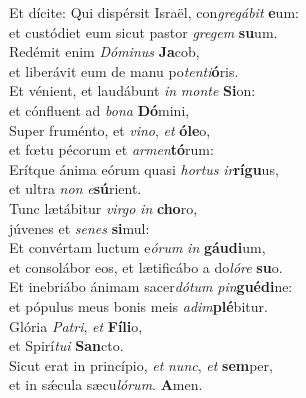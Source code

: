 \evenverse Et dícite: Qui dispérsit Israël, con\textit{gre}\textit{gá}\textit{bit} \textbf{e}um:~\*\\
\evenverse et custódiet eum sicut pastor \textit{gre}\textit{gem} \textbf{su}um.\\
\oddverse Redémit enim \textit{Dó}\textit{mi}\textit{nus} \textbf{Ja}cob,~\*\\
\oddverse et liberávit eum de manu po\textit{ten}\textit{ti}\textbf{ó}ris.\\
\evenverse Et vénient, et laudábunt \textit{in} \textit{mon}\textit{te} \textbf{Si}on:~\*\\
\evenverse et cónfluent ad \textit{bo}\textit{na} \textbf{Dó}mini,\\
\oddverse Super fruménto, et \textit{vi}\textit{no}, \textit{et} \textbf{ó}\textbf{le}o,~\*\\
\oddverse et fœtu pécorum et \textit{ar}\textit{men}\textbf{tó}rum:\\
\evenverse Erítque ánima eórum quasi \textit{hor}\textit{tus} \textit{ir}\textbf{rí}\textbf{gu}us,~\*\\
\evenverse et ultra \textit{non} \textit{e}\textbf{sú}rient.\\
\oddverse Tunc lætábitur \textit{vir}\textit{go} \textit{in} \textbf{cho}ro,~\*\\
\oddverse júvenes et \textit{se}\textit{nes} \textbf{si}mul:\\
\evenverse Et convértam luctum e\textit{ó}\textit{rum} \textit{in} \textbf{gáu}\textbf{di}um,~\*\\
\evenverse et consolábor eos, et lætificábo a do\textit{ló}\textit{re} \textbf{su}o.\\
\oddverse Et inebriábo ánimam sacer\textit{dó}\textit{tum} \textit{pin}\textbf{gué}\textbf{di}ne:~\*\\
\oddverse et pópulus meus bonis meis \textit{a}\textit{dim}\textbf{plé}bitur.\\
\evenverse Glória \textit{Pa}\textit{tri}, \textit{et} \textbf{Fí}\textbf{li}o,~\*\\
\evenverse et Spirí\textit{tu}\textit{i} \textbf{San}cto.\\
\oddverse Sicut erat in princípio, \textit{et} \textit{nunc}, \textit{et} \textbf{sem}per,~\*\\
\oddverse et in sǽcula sæcu\textit{ló}\textit{rum}. \textbf{A}men.\\
